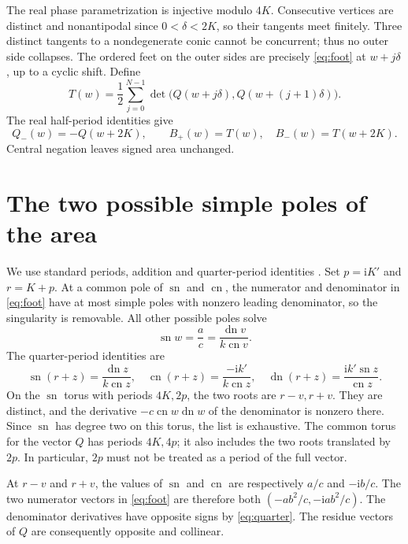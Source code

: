 \documentclass[11pt]{article}
\newcommand{\sn}{\operatorname{sn}}
\newcommand{\cn}{\operatorname{cn}}
\newcommand{\dn}{\operatorname{dn}}
\newcommand{\ii}{\mathrm{i}}
\begin{document}
The real phase parametrization is injective modulo $4K$. Consecutive
vertices are distinct and nonantipodal since $0<\delta<2K$, so their
tangents meet finitely. Three distinct tangents to a nondegenerate conic
cannot be concurrent; thus no outer side collapses. The ordered feet on
the outer sides are precisely \eqref{eq:foot} at $w+j\delta$, up to a
cyclic shift. Define
\begin{equation}\label{eq:trace}
 T(w)=\frac12\sum_{j=0}^{N-1}
 \det\bigl(Q(w+j\delta),Q(w+(j+1)\delta)\bigr).
\end{equation}
The real half-period identities give
\begin{equation}\label{eq:focus}
 Q_-(w)=-Q(w+2K),\qquad B_+(w)=T(w),\quad B_-(w)=T(w+2K).
\end{equation}
Central negation leaves signed area unchanged.

\section{The two possible simple poles of the area}
We use standard periods, addition and quarter-period identities
\cite[Sections 22.4 and 22.8]{DLMF}. Set $p=\ii K'$ and $r=K+p$.
At a common pole of $\sn$ and $\cn$, the numerator and denominator in
\eqref{eq:foot} have at most simple poles with nonzero leading denominator,
so the singularity is removable. All other possible poles solve
\[
 \sn w=\frac ac=\frac{\dn v}{k\cn v}.
\]
The quarter-period identities are
\begin{equation}\label{eq:quarter}
 \sn(r+z)=\frac{\dn z}{k\cn z},\quad
 \cn(r+z)=\frac{-\ii k'}{k\cn z},\quad
 \dn(r+z)=\frac{\ii k'\sn z}{\cn z}.
\end{equation}
On the $\sn$ torus with periods $4K,2p$, the two roots are
$r-v,r+v$. They are distinct, and the derivative
$-c\cn w\dn w$ of the denominator is nonzero there.
Since $\sn$ has degree two on this torus, the list is exhaustive.
The common torus for the vector $Q$ has periods $4K,4p$;
it also includes the two roots translated by $2p$.
In particular, $2p$ must not be treated as a period of the full vector.

At $r-v$ and $r+v$, the values of $\sn$ and $\cn$ are respectively
$a/c$ and $-\ii b/c$. The two numerator vectors in \eqref{eq:foot}
are therefore both $(-ab^2/c,-\ii ab^2/c)$. The denominator derivatives
have opposite signs by \eqref{eq:quarter}. The residue vectors of $Q$
are consequently opposite and collinear.
\end{document}
